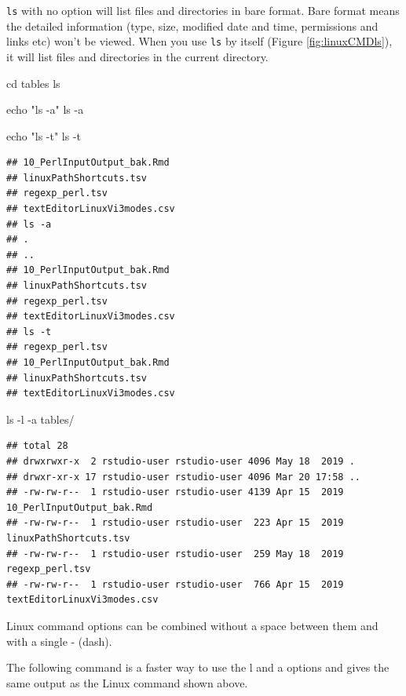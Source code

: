 \documentclass[]{book}
\makeatletter
\newenvironment{Shaded}{\begin{snugshade}}{\end{snugshade}}
\newcommand{\BuiltInTok}[1]{#1}
\newcommand{\FunctionTok}[1]{\textcolor[rgb]{0.00,0.00,0.00}{#1}}
\newcommand{\NormalTok}[1]{#1}
\newcommand{\StringTok}[1]{\textcolor[rgb]{0.31,0.60,0.02}{#1}}
\newenvironment{kframe}{%
\medskip{}
\setlength{\fboxsep}{.8em}
 \def\at@end@of@kframe{}%
 \ifinner\ifhmode%
  \def\at@end@of@kframe{\end{minipage}}%
  \begin{minipage}{\columnwidth}%
 \fi\fi%
 \def\FrameCommand##1{\hskip\@totalleftmargin \hskip-\fboxsep
 \colorbox{shadecolor}{##1}\hskip-\fboxsep
     \hskip-\linewidth \hskip-\@totalleftmargin \hskip\columnwidth}%
 \MakeFramed {\advance\hsize-\width
   \@totalleftmargin\z@ \linewidth\hsize
   \@setminipage}}%
 {\par\unskip\endMakeFramed%
 \at@end@of@kframe}
\renewenvironment{Shaded}{\begin{kframe}}{\end{kframe}}
\makeatother
\begin{document}
\texttt{ls} with no option will list files and directories in bare format. Bare format means the detailed information (type, size, modified date and time, permissions and links etc) won't be viewed. When you use \texttt{ls} by itself (Figure \ref{fig:linuxCMDls}), it will list files and directories in the current directory.

\begin{Shaded}
\begin{Highlighting}[]
\BuiltInTok{cd}\NormalTok{ tables}
\FunctionTok{ls}

\BuiltInTok{echo} \StringTok{"ls -a"}
\FunctionTok{ls}\NormalTok{ -a }

\BuiltInTok{echo} \StringTok{"ls -t"}
\FunctionTok{ls}\NormalTok{ -t}
\end{Highlighting}
\end{Shaded}

\begin{verbatim}
## 10_PerlInputOutput_bak.Rmd
## linuxPathShortcuts.tsv
## regexp_perl.tsv
## textEditorLinuxVi3modes.csv
## ls -a
## .
## ..
## 10_PerlInputOutput_bak.Rmd
## linuxPathShortcuts.tsv
## regexp_perl.tsv
## textEditorLinuxVi3modes.csv
## ls -t
## regexp_perl.tsv
## 10_PerlInputOutput_bak.Rmd
## linuxPathShortcuts.tsv
## textEditorLinuxVi3modes.csv
\end{verbatim}

\begin{Shaded}
\begin{Highlighting}[]
\FunctionTok{ls}\NormalTok{ -l -a tables/}
\end{Highlighting}
\end{Shaded}

\begin{verbatim}
## total 28
## drwxrwxr-x  2 rstudio-user rstudio-user 4096 May 18  2019 .
## drwxr-xr-x 17 rstudio-user rstudio-user 4096 Mar 20 17:58 ..
## -rw-rw-r--  1 rstudio-user rstudio-user 4139 Apr 15  2019 10_PerlInputOutput_bak.Rmd
## -rw-rw-r--  1 rstudio-user rstudio-user  223 Apr 15  2019 linuxPathShortcuts.tsv
## -rw-rw-r--  1 rstudio-user rstudio-user  259 May 18  2019 regexp_perl.tsv
## -rw-rw-r--  1 rstudio-user rstudio-user  766 Apr 15  2019 textEditorLinuxVi3modes.csv
\end{verbatim}

Linux command options can be combined without a space between them and with a single - (dash).

The following command is a faster way to use the l and a options and gives the same output as the Linux command shown above.
\end{document}
